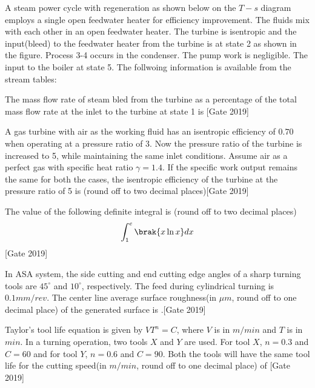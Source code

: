 	\item A steam power cycle with regeneration as shown below on the $T-s$ diagram employs a single open feedwater heater for efficiency improvement. The fluids mix with each other in an open feedwater heater. The turbine is isentropic and the input(bleed) to the feedwater heater from the turbine is at state 2 as shown in the figure. Process 3-4 occurs in the condenser. The pump work is negligible. The input to the boiler at state 5. The follwoing information is available from the stream tables:
		 
The mass flow rate of steam bled from the turbine as a percentage of the total mass flow rate at the inlet to the turbine at state 1 is \underline{\hspace{2cm}}\hfill{[Gate 2019]}
	\item A gas turbine with air as the working fluid has an isentropic efficiency of $0.70$ when operating at a pressure ratio of $3$. Now the pressure ratio of the turbine is increased to 5, while maintaining the same inlet conditions. Assume air as a perfect gas with specific heat ratio $\gamma = 1.4$. If the specific work output remains the same for both the cases, the isentropic efficiency of the turbine at the pressure ratio of 5 is \underline{\hspace{2cm}}(round off to two decimal places)\hfill{[Gate 2019]}
	\item The value of the following definite integral is \underline{\hspace{2cm}}(round off to two decimal places)
	\begin{align}
	\int_1^e \brak{x\ln{x}}dx \notag
	\end{align}\hfill{[Gate 2019]}
	\item In ASA system, the side cutting and end cutting edge angles of a sharp turning tools are $45^{\circ}$ and $10^{\circ}$, respectively. The feed during cylindrical turning is $0.1mm/{rev}$. The center line average surface roughness(in $\mu m$, round off to one decimal place) of the generated surface is \underline{\hspace{2cm}}.\hfill{[Gate 2019]}
	\item Taylor's tool life equation is given by $VT^n = C$, where $V$ is in $m/{min}$ and $T$ is in $min$. In a turning operation, two tools $X$ and $Y$ are used. For tool $X$, $n = 0.3$ and $C=60$ and for tool $Y$, $n=0.6$ and $C=90$. Both the tools will have the same tool life for the cutting speed(in $m/min$, round off to one decimal place) of \underline{\hspace{2cm}}\hfill{[Gate 2019]}
